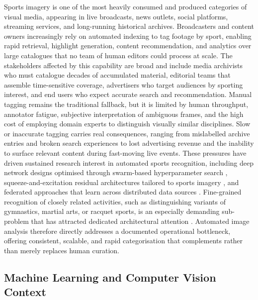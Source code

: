 Sports imagery is one of the most heavily consumed and produced categories of visual media, appearing in live broadcasts, news outlets, social platforms, streaming services, and long-running historical archives.
Broadcasters and content owners increasingly rely on automated indexing to tag footage by sport, enabling rapid retrieval, highlight generation, content recommendation, and analytics over large catalogues that no team of human editors could process at scale.
The stakeholders affected by this capability are broad and include media archivists who must catalogue decades of accumulated material, editorial teams that assemble time-sensitive coverage, advertisers who target audiences by sporting interest, and end users who expect accurate search and recommendation.
Manual tagging remains the traditional fallback, but it is limited by human throughput, annotator fatigue, subjective interpretation of ambiguous frames, and the high cost of employing domain experts to distinguish visually similar disciplines.
Slow or inaccurate tagging carries real consequences, ranging from mislabelled archive entries and broken search experiences to lost advertising revenue and the inability to surface relevant content during fast-moving live events.
These pressures have driven sustained research interest in automated sports recognition, including deep network designs optimised through swarm-based hyperparameter search \citep{zhou2024tuna}, squeeze-and-excitation residual architectures tailored to sports imagery \citep{li2024seres}, and federated approaches that learn across distributed data sources \citep{fu2024federated}.
Fine-grained recognition of closely related activities, such as distinguishing variants of gymnastics, martial arts, or racquet sports, is an especially demanding sub-problem that has attracted dedicated architectural attention \citep{bera2023finegrained}.
Automated image analysis therefore directly addresses a documented operational bottleneck, offering consistent, scalable, and rapid categorisation that complements rather than merely replaces human curation.

\subsection{Machine Learning and Computer Vision Context}
\label{sec:intro-cv-context}

